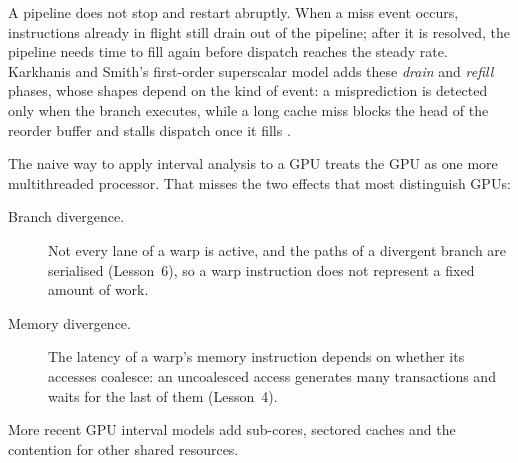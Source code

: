 \documentclass[../main.tex]{subfiles}
\begin{document}
A pipeline does not stop and restart abruptly.  When a miss event
occurs, instructions already in flight still drain out of the pipeline;
after it is resolved, the pipeline needs time to fill again before
dispatch reaches the steady rate.  Karkhanis and Smith's first-order
superscalar model adds these \emph{drain} and \emph{refill} phases,
whose shapes depend on the kind of event: a misprediction is detected
only when the branch executes, while a long cache miss blocks the
head of the reorder buffer and stalls dispatch once it fills
\cite{karkhanis2004firstorder}.

The naive way to apply interval analysis to a GPU treats the GPU as one
more multithreaded processor.  That misses the two effects that most
distinguish GPUs:
\begin{description}
  \item[Branch divergence.]  Not every lane of a warp is active, and
    the paths of a divergent branch are serialised (Lesson~6), so a
    warp instruction does not represent a fixed amount of work.
  \item[Memory divergence.]  The latency of a warp's memory
    instruction depends on whether its accesses coalesce: an
    uncoalesced access generates many transactions and waits for the
    last of them (Lesson~4).
\end{description}
%
More recent GPU interval models add sub-cores, sectored caches and the
contention for other shared resources.
\end{document}
